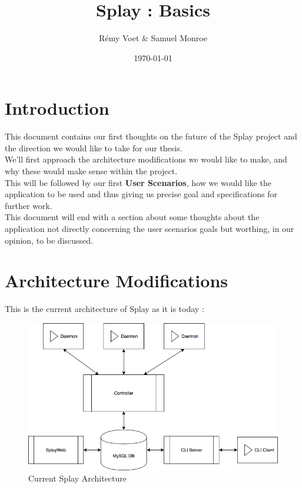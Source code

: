 \documentclass{article}
\title{Splay : Basics}
\author{Rémy Voet & Samuel Monroe}
\date{\today}
\begin{document}
\maketitle

\section{Introduction}

  This document contains our first thoughts on the future of the Splay project
  and the direction we would like to take for our thesis.\\

  We'll first approach the architecture modifications we would like to
  make, and why these would make sense within the project.\\
  This will be followed by our first \textbf{User Scenarios}, how we
  would like the application to be used and thus giving us precise goal and
  specifications for further work.\\

  This document will end with a section about some thoughts about the
  application not directly concerning the user scenarios goals but
  worthing, in our opinion, to be discussed.

\section{Architecture Modifications}

  This is the current architecture of Splay as it is today : \\

  \begin{figure}[H]
   \caption{\label{curr_arch} Current Splay Architecture}
   \includegraphics[scale=0.6]{images/curr_arch.png}
  \end{figure}
\end{document}
